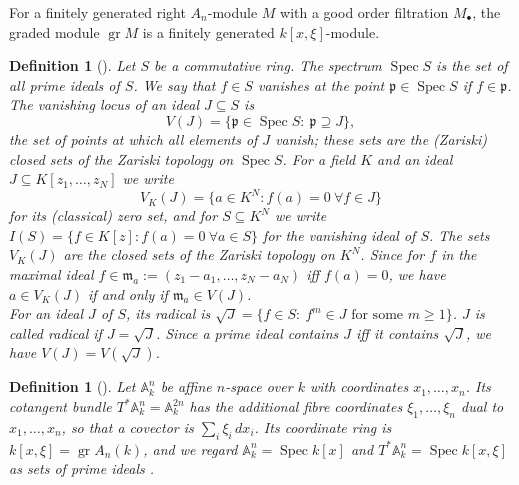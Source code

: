 \documentclass[pdflatex,sn-mathphys-num]{sn-jnl}
\numberwithin{equation}{section}
\theoremstyle{thmstyleone}
\newtheorem{definition}[theorem]{Definition}
\theoremstyle{thmstyletwo}
\newcommand{\gr}{\operatorname{gr}}
\begin{document}
For a finitely generated right $A_n$-module $M$ with a good order filtration
$M_\bullet$, the graded module $\gr M$ is a finitely generated $k[x,\xi]$-module.

\begin{definition}[{\cite[Ch. 1]{atiyah}}]\label{def:spec}
Let $S$ be a commutative ring. The \emph{spectrum} $\operatorname{Spec}S$ is the set
of all prime ideals of $S$. We say that $f\in S$ vanishes at the point
$\mathfrak p\in\operatorname{Spec}S$ if $f\in\mathfrak p$. The \emph{vanishing locus}
of an ideal $J\subseteq S$ is
\[ V(J)=\{\mathfrak p\in\operatorname{Spec}S:\ \mathfrak p\supseteq J\},\]
the set of points at which all elements of $J$ vanish; these sets are the (Zariski) closed sets
of the Zariski topology on $\operatorname{Spec}S$. For a field $K$ and an ideal $J\subseteq K[z_1,\dots,z_N]$ we write
\[V_K(J)=\{a\in K^N : f(a)=0\ \forall f\in J\}\]
for its (classical) zero set, and for $S\subseteq K^N$ we write
$I(S)=\{f\in K[z]: f(a)=0\ \forall a\in S\}$ for the \emph{vanishing ideal} of $S$.
The sets $V_K(J)$ are the closed sets of the Zariski topology on $K^N$.
Since for $f$ in the maximal ideal $f\in\mathfrak m_a:=(z_1-a_1,\dots,z_N-a_N)$ iff $f(a)=0$, we have
$a\in V_K(J)$ if and only if $\mathfrak m_a\in V(J)$.\\
For an ideal $J$ of $S$, its \emph{radical} is
$\sqrt J=\{f\in S:\ f^m\in J\text{ for some }m\ge1\}$. $J$ is called \emph{radical} if $J=\sqrt J$. Since a prime ideal contains $J$
iff it contains $\sqrt J$, we have $V(J)=V(\sqrt J)$.
\end{definition}

\begin{definition}[{\cite[Appendix E]{HTT}}]\label{def:cotangent}
Let $\mathbb A^n_k$ be affine $n$-space over $k$ with coordinates $x_1,\dots,x_n$.
Its \emph{cotangent bundle} $T^*\mathbb A^n_k=\mathbb A^{2n}_k$ has the additional
fibre coordinates $\xi_1,\dots,\xi_n$ dual to $x_1,\dots,x_n$, so that a covector is
$\sum_i\xi_i\,dx_i$. Its coordinate ring is $k[x,\xi]=\gr A_n(k)$, and we regard
$\mathbb A^n_k=\operatorname{Spec}k[x]$ and $T^*\mathbb A^n_k=\operatorname{Spec}k[x,\xi]$
as sets of prime ideals \cite[Tag 00DZ]{Stacks}.
\end{definition}


\end{document}
